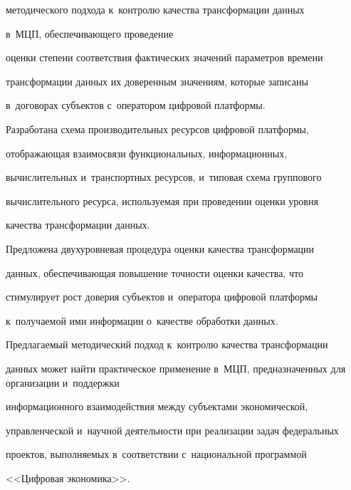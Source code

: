 методического подхода к~контролю качества трансформации данных 

в~МЦП, обес\-пе\-чи\-ва\-юще\-го проведение 

оцен\-ки степени соответствия фактических значений па\-ра\-мет\-ров времени 

трансформации данных их доверенным значениям, которые записаны 

в~договорах субъектов с~оператором циф\-ро\-вой плат\-формы.

  

  Разработана схема производительных ресурсов циф\-ро\-вой плат\-фор\-мы, 

отобра\-жа\-ющая взаимосвязи функциональных, информационных, 

вы\-чис\-ли\-тель\-ных и~транспортных ресурсов, и~типовая схема группового 

вы\-чис\-ли\-тель\-но\-го ресурса, ис\-поль\-зу\-емая при проведении оцен\-ки уров\-ня 

качества трансформации данных. 

  

  Предложена двухуровневая процедура оценки качества трансформации 

данных, обес\-пе\-чи\-ва\-ющая повышение точ\-ности оцен\-ки качества, что 

стимулирует рост доверия субъектов и~оператора циф\-ро\-вой плат\-фор\-мы 

к~по\-лу\-ча\-емой ими информации о~качестве обработки данных. 

  

  Предлагаемый методический подход к~контролю качества транс\-фор\-ма\-ции 

данных может найти практическое применение в~МЦП, пред\-на\-зна\-чен\-ных для организации и~поддержки 

информационного взаимодействия меж\-ду субъектами экономической, 

управ\-лен\-че\-ской и~научной де\-я\-тель\-ности при реализации задач федеральных 

проектов, вы\-пол\-ня\-емых в~соответствии с~национальной программой 

<<Циф\-ро\-вая экономика>>. 

  

